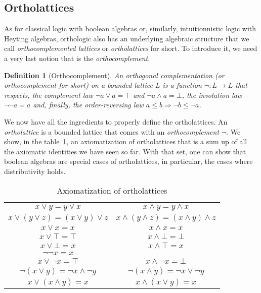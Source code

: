 \documentclass[a4paper, 11pt]{article}
\newtheorem{definition}[theorem]{Definition}
\begin{document}
    \subsection{Ortholattices}
    As for classical logic with boolean algebras or, similarly, intuitionnistic logic with Heyting 
    algebras, orthologic also has an underlying algebraic structure that we call 
    \textit{orthocomplemented lattices} or \textit{ortholattices} for short. To introduce it, we need
    a very last notion that is the \textit{orthocomplement}.
    \begin{definition}[Orthocomplement]
	    An orthogonal complementation (or orthocomplement for short) on a bounded lattice $L$ is a
	    function $\neg:L\rightarrow L$ that respects, the complement law $\neg a\vee a=\top$ and
	    $\neg a\wedge a=\bot$, the involution law $\neg\neg a=a$ and, finally, the order-reversing
	    law $a\leq b\Rightarrow\neg b\leq\neg a$.
    \end{definition}
    We now have all the ingredients to properly define the ortholattices. An \textit{ortholattice} is a 
    bounded
    lattice that comes with an \textit{orthocomplement} $\neg$. We show, in the table~\ref{tab_ax},
    an axiomatization of ortholattices that is a sum up of all the axiomatic identities we have seen so
    far. With that set, one can show that boolean algebras are special cases of ortholattices, in 
    particular, the cases where distributivity holds.
    \begin{table}[h]
	    \caption{Axiomatization of ortholattices}
	    \label{tab_ax}
    \begin{center} 
	    \begin{tabular}{ c|c }
		    $x\vee y=y\vee x$&$x\wedge y=y\wedge x$\\
		    $x\vee(y\vee z)=(x\vee y)\vee z$&$x\wedge(y\wedge z)=(x\wedge y)\wedge z$\\
		    $x\vee x=x$&$x\wedge x=x$\\
		    $x\vee\top=\top$&$x\wedge\bot=\bot$\\
		    $x\vee\bot=x$&$x\wedge\top=x$\\
		    $\neg\neg x=x$& \\
		    $x\vee\neg x=\top$&$x\wedge\neg x=\bot$\\
		    $\neg(x\vee y)=\neg x\wedge\neg y$&$\neg(x\wedge y)=\neg x\vee\neg y$\\
		    $x\vee(x\wedge y)=x$&$x\wedge(x\vee y)=x$
	    \end{tabular}
    \end{center}
    \end{table}
\end{document}
